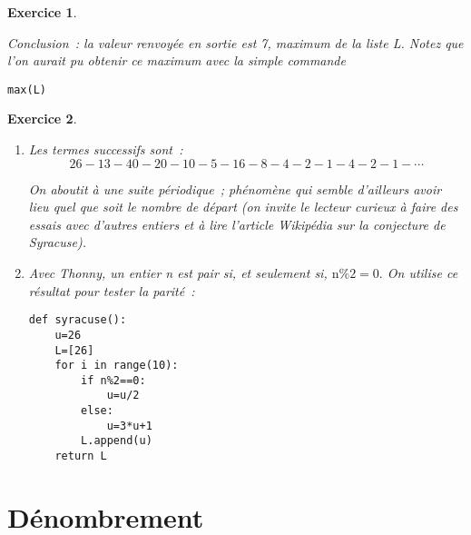 \documentclass[10pt]{article}
\newtheorem{exo}{Exercice}
\begin{document}
\begin{exo}
\begin{multicols}{2}
\vspace*{1cm}



\end{multicols}

\medskip

Conclusion~: la valeur renvoyée en sortie est 7, maximum de la liste L. Notez que l'on aurait pu obtenir ce maximum avec la simple commande

\begin{lstlisting}
max(L)
\end{lstlisting}



\end{exo}


\begin{exo}


\begin{enumerate}
\item Les termes successifs sont~:
\[26 - 13 - 40 - 20 - 10 -5 -16 - 8 - 4 - 2 - 1 - 4 - 2 - 1- \cdots\]

On aboutit à une suite périodique~; phénomène qui semble d'ailleurs avoir lieu quel que soit le nombre de départ (on invite le lecteur curieux à faire des essais avec d'autres entiers et à lire l'article Wikipédia sur la conjecture de Syracuse).
\item Avec Thonny, un entier n est pair si, et seulement si, $\text{n}\%2=0.$ On utilise ce résultat pour tester la parité~:

\medskip

\begin{lstlisting}
def syracuse():
	u=26
	L=[26]
	for i in range(10):
		if n%2==0:
			u=u/2
		else:
			u=3*u+1
		L.append(u)
	return L
\end{lstlisting}


 \end{enumerate}

\end{exo} 


\section{Dénombrement}
\end{document}

